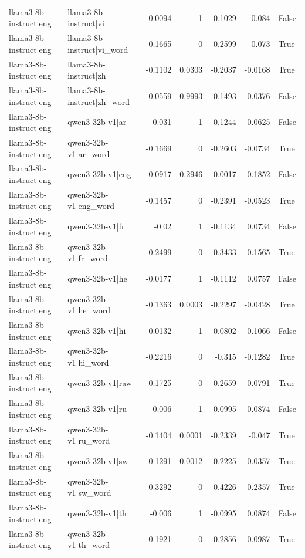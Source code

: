 \begin{table}
\begin{tabular}{l l r r r r l}
llama3-8b-instruct|eng & llama3-8b-instruct|vi & -0.0094 & 1 & -0.1029 & 0.084 & False \\
llama3-8b-instruct|eng & llama3-8b-instruct|vi_word & -0.1665 & 0 & -0.2599 & -0.073 & True \\
llama3-8b-instruct|eng & llama3-8b-instruct|zh & -0.1102 & 0.0303 & -0.2037 & -0.0168 & True \\
llama3-8b-instruct|eng & llama3-8b-instruct|zh_word & -0.0559 & 0.9993 & -0.1493 & 0.0376 & False \\
llama3-8b-instruct|eng & qwen3-32b-v1|ar & -0.031 & 1 & -0.1244 & 0.0625 & False \\
llama3-8b-instruct|eng & qwen3-32b-v1|ar_word & -0.1669 & 0 & -0.2603 & -0.0734 & True \\
llama3-8b-instruct|eng & qwen3-32b-v1|eng & 0.0917 & 0.2946 & -0.0017 & 0.1852 & False \\
llama3-8b-instruct|eng & qwen3-32b-v1|eng_word & -0.1457 & 0 & -0.2391 & -0.0523 & True \\
llama3-8b-instruct|eng & qwen3-32b-v1|fr & -0.02 & 1 & -0.1134 & 0.0734 & False \\
llama3-8b-instruct|eng & qwen3-32b-v1|fr_word & -0.2499 & 0 & -0.3433 & -0.1565 & True \\
llama3-8b-instruct|eng & qwen3-32b-v1|he & -0.0177 & 1 & -0.1112 & 0.0757 & False \\
llama3-8b-instruct|eng & qwen3-32b-v1|he_word & -0.1363 & 0.0003 & -0.2297 & -0.0428 & True \\
llama3-8b-instruct|eng & qwen3-32b-v1|hi & 0.0132 & 1 & -0.0802 & 0.1066 & False \\
llama3-8b-instruct|eng & qwen3-32b-v1|hi_word & -0.2216 & 0 & -0.315 & -0.1282 & True \\
llama3-8b-instruct|eng & qwen3-32b-v1|raw & -0.1725 & 0 & -0.2659 & -0.0791 & True \\
llama3-8b-instruct|eng & qwen3-32b-v1|ru & -0.006 & 1 & -0.0995 & 0.0874 & False \\
llama3-8b-instruct|eng & qwen3-32b-v1|ru_word & -0.1404 & 0.0001 & -0.2339 & -0.047 & True \\
llama3-8b-instruct|eng & qwen3-32b-v1|sw & -0.1291 & 0.0012 & -0.2225 & -0.0357 & True \\
llama3-8b-instruct|eng & qwen3-32b-v1|sw_word & -0.3292 & 0 & -0.4226 & -0.2357 & True \\
llama3-8b-instruct|eng & qwen3-32b-v1|th & -0.006 & 1 & -0.0995 & 0.0874 & False \\
llama3-8b-instruct|eng & qwen3-32b-v1|th_word & -0.1921 & 0 & -0.2856 & -0.0987 & True \\

\end{tabular}
\end{table}
